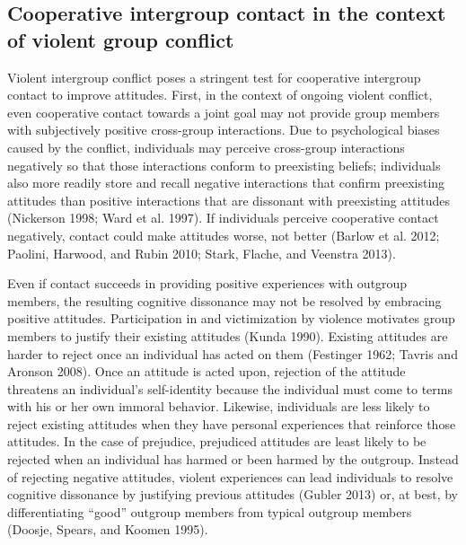 \documentclass[11pt]{article}
\begin{document}
\hypertarget{cooperative-intergroup-contact-in-the-context-of-violent-group-conflict}{%
\subsection{Cooperative intergroup contact in the context of violent
group
conflict}\label{cooperative-intergroup-contact-in-the-context-of-violent-group-conflict}}

Violent intergroup conflict poses a stringent test for cooperative
intergroup contact to improve attitudes. First, in the context of
ongoing violent conflict, even cooperative contact towards a joint goal
may not provide group members with subjectively positive cross-group
interactions. Due to psychological biases caused by the conflict,
individuals may perceive cross-group interactions negatively so that
those interactions conform to preexisting beliefs; individuals also more
readily store and recall negative interactions that confirm preexisting
attitudes than positive interactions that are dissonant with preexisting
attitudes (Nickerson 1998; Ward et al. 1997). If individuals perceive
cooperative contact negatively, contact could make attitudes worse, not
better (Barlow et al. 2012; Paolini, Harwood, and Rubin 2010; Stark,
Flache, and Veenstra 2013).

Even if contact succeeds in providing positive experiences with outgroup
members, the resulting cognitive dissonance may not be resolved by
embracing positive attitudes. Participation in and victimization by
violence motivates group members to justify their existing attitudes
(Kunda 1990). Existing attitudes are harder to reject once an individual
has acted on them (Festinger 1962; Tavris and Aronson 2008). Once an
attitude is acted upon, rejection of the attitude threatens an
individual's self-identity because the individual must come to terms
with his or her own immoral behavior. Likewise, individuals are less
likely to reject existing attitudes when they have personal experiences
that reinforce those attitudes. In the case of prejudice, prejudiced
attitudes are least likely to be rejected when an individual has harmed
or been harmed by the outgroup. Instead of rejecting negative attitudes,
violent experiences can lead individuals to resolve cognitive dissonance
by justifying previous attitudes (Gubler 2013) or, at best, by
differentiating ``good'' outgroup members from typical outgroup members
(Doosje, Spears, and Koomen 1995).
\end{document}
